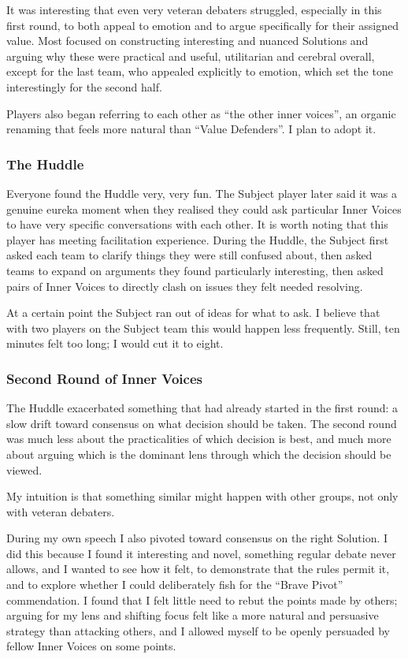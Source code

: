 \documentclass[12pt]{article}
\begin{document}
It was interesting that even very veteran debaters struggled, especially in this first round, to both appeal to emotion and to argue specifically for their assigned value. Most focused on constructing interesting and nuanced Solutions and arguing why these were practical and useful, utilitarian and cerebral overall, except for the last team, who appealed explicitly to emotion, which set the tone interestingly for the second half.

Players also began referring to each other as ``the other inner voices'', an organic renaming that feels more natural than ``Value Defenders''. I plan to adopt it.

\subsubsection{The Huddle}

Everyone found the Huddle very, very fun. The Subject player later said it was a genuine eureka moment when they realised they could ask particular Inner Voices to have very specific conversations with each other. It is worth noting that this player has meeting facilitation experience. During the Huddle, the Subject first asked each team to clarify things they were still confused about, then asked teams to expand on arguments they found particularly interesting, then asked pairs of Inner Voices to directly clash on issues they felt needed resolving.

At a certain point the Subject ran out of ideas for what to ask. I believe that with two players on the Subject team this would happen less frequently. Still, ten minutes felt too long; I would cut it to eight.

\subsubsection{Second Round of Inner Voices}

The Huddle exacerbated something that had already started in the first round: a slow drift toward consensus on what decision should be taken. The second round was much less about the practicalities of which decision is best, and much more about arguing which is the dominant lens through which the decision should be viewed.

My intuition is that something similar might happen with other groups, not only with veteran debaters.

During my own speech I also pivoted toward consensus on the right Solution. I did this because I found it interesting and novel, something regular debate never allows, and I wanted to see how it felt, to demonstrate that the rules permit it, and to explore whether I could deliberately fish for the ``Brave Pivot'' commendation. I found that I felt little need to rebut the points made by others; arguing for my lens and shifting focus felt like a more natural and persuasive strategy than attacking others, and I allowed myself to be openly persuaded by fellow Inner Voices on some points.
\end{document}

